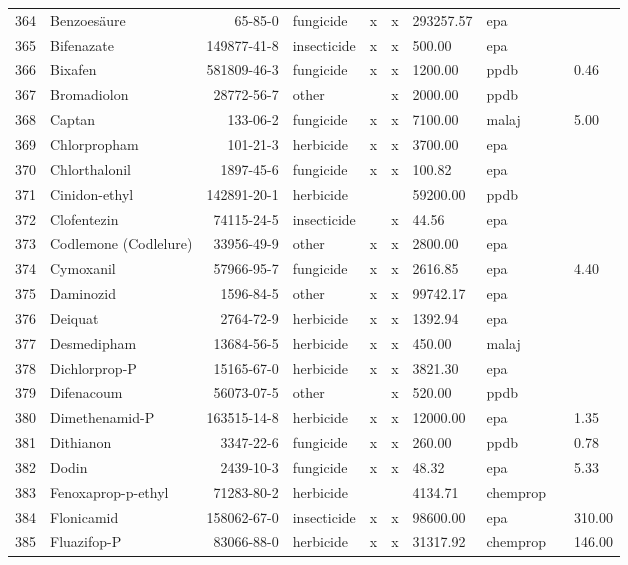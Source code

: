 \begin{longtable}{lp{3cm}rlp{0.5cm}p{0.5cm}p{1.5cm}p{1cm}p{1cm}p{1cm}}
  364 & Benzoesäure & 65-85-0 & fungicide & x & x & 293257.57 & epa &  &  \\ 
  365 & Bifenazate & 149877-41-8 & insecticide & x & x & 500.00 & epa &  &  \\ 
  366 & Bixafen & 581809-46-3 & fungicide & x & x & 1200.00 & ppdb &  & 0.46 \\ 
  367 & Bromadiolon & 28772-56-7 & other &  & x & 2000.00 & ppdb &  &  \\ 
  368 & Captan & 133-06-2 & fungicide & x & x & 7100.00 & malaj &  & 5.00 \\ 
  369 & Chlorpropham & 101-21-3 & herbicide & x & x & 3700.00 & epa &  &  \\ 
  370 & Chlorthalonil & 1897-45-6 & fungicide & x & x & 100.82 & epa &  &  \\ 
  371 & Cinidon-ethyl & 142891-20-1 & herbicide &  &  & 59200.00 & ppdb &  &  \\ 
  372 & Clofentezin & 74115-24-5 & insecticide &  & x & 44.56 & epa &  &  \\ 
  373 & Codlemone (Codlelure) & 33956-49-9 & other & x & x & 2800.00 & epa &  &  \\ 
  374 & Cymoxanil & 57966-95-7 & fungicide & x & x & 2616.85 & epa &  & 4.40 \\ 
  375 & Daminozid & 1596-84-5 & other & x & x & 99742.17 & epa &  &  \\ 
  376 & Deiquat & 2764-72-9 & herbicide & x & x & 1392.94 & epa &  &  \\ 
  377 & Desmedipham & 13684-56-5 & herbicide & x & x & 450.00 & malaj &  &  \\ 
  378 & Dichlorprop-P & 15165-67-0 & herbicide & x & x & 3821.30 & epa &  &  \\ 
  379 & Difenacoum & 56073-07-5 & other &  & x & 520.00 & ppdb &  &  \\ 
  380 & Dimethenamid-P & 163515-14-8 & herbicide & x & x & 12000.00 & epa &  & 1.35 \\ 
  381 & Dithianon & 3347-22-6 & fungicide & x & x & 260.00 & ppdb &  & 0.78 \\ 
  382 & Dodin & 2439-10-3 & fungicide & x & x & 48.32 & epa &  & 5.33 \\ 
  383 & Fenoxaprop-p-ethyl & 71283-80-2 & herbicide &  &  & 4134.71 & chemprop &  &  \\ 
  384 & Flonicamid & 158062-67-0 & insecticide & x & x & 98600.00 & epa &  & 310.00 \\ 
  385 & Fluazifop-P & 83066-88-0 & herbicide & x & x & 31317.92 & chemprop &  & 146.00 \\ 

\end{longtable}
